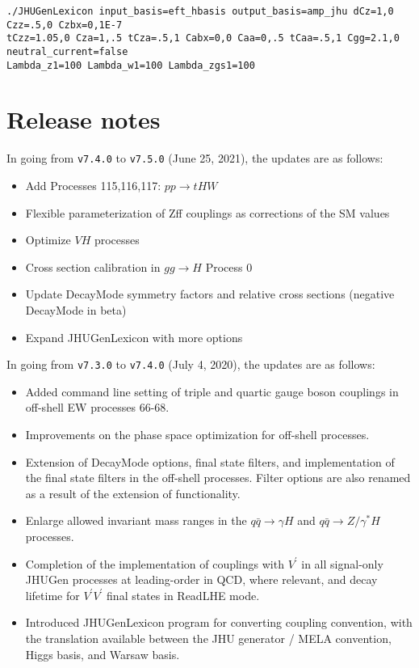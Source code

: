 \documentclass[aps,superscriptaddress,nofootinbib]{revtex4}
\begin{document}
\begin{verbatim}
./JHUGenLexicon input_basis=eft_hbasis output_basis=amp_jhu dCz=1,0 Czz=.5,0 Czbx=0,1E-7 
tCzz=1.05,0 Cza=1,.5 tCza=.5,1 Cabx=0,0 Caa=0,.5 tCaa=.5,1 Cgg=2.1,0 neutral_current=false 
Lambda_z1=100 Lambda_w1=100 Lambda_zgs1=100
\end{verbatim}

\section{Release notes}
\noindent
In going from \verb|v7.4.0| to \verb|v7.5.0| (June 25, 2021), the updates are as follows:
\begin{itemize}
\item Add Processes 115,116,117: $pp\to tHW$
\item Flexible parameterization of Zff couplings as corrections of the SM values 
\item Optimize $VH$ processes 
\item Cross section calibration in $gg\to H$ Process 0
\item Update DecayMode symmetry factors and relative cross sections (negative DecayMode in beta)
\item Expand JHUGenLexicon with more options 
\end{itemize}
\noindent
In going from \verb|v7.3.0| to \verb|v7.4.0| (July 4, 2020), the updates are as follows:
\begin{itemize}
\item Added command line setting of triple and quartic gauge boson couplings in off-shell EW processes 66-68.
\item Improvements on the phase space optimization for off-shell processes.
\item Extension of DecayMode options, final state filters, and implementation of the final state filters in the off-shell processes. Filter options are also renamed as a result of the extension of functionality.
\item Enlarge allowed invariant mass ranges in the $q\bar{q} \to \gamma H$ and $q\bar{q} \to Z/\gamma^* H$ processes.
\item Completion of the implementation of couplings with $V^\prime$ in all signal-only JHUGen processes at leading-order in QCD, where relevant, and decay lifetime for $V^\prime V^\prime$ final states in ReadLHE mode.
\item Introduced JHUGenLexicon program for converting coupling convention, 
with the translation available between the JHU generator / MELA convention, Higgs basis, and Warsaw basis. 
\end{itemize}
\end{document}
